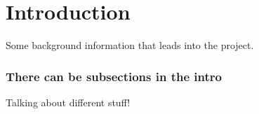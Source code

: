 \chapter{Introduction}

Some background information that leads into the project.

\subsection*{There can be subsections in the intro}

Talking about different stuff!
